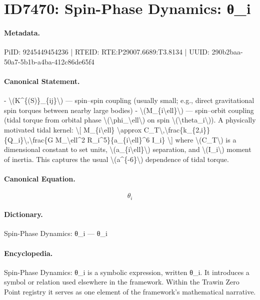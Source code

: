 \section*{ID7470: Spin-Phase Dynamics: θ\_i}
\paragraph{Metadata.}
PiID: 9245449454236 | RTEID: RTE:P29007.6689:T3.8134 | UUID: 290b2baa-50a7-5b1b-a4ba-412c86de65f4

\paragraph{Canonical Statement.}
- \textbackslash{}(K\textasciicircum{}\{(S)\}\_\{ij\}\textbackslash{}) — spin–spin coupling (usually small; e.g., direct gravitational spin torques between nearby large bodies) - \textbackslash{}(M\_\{i\textbackslash{}ell\}\textbackslash{}) — spin–orbit coupling (tidal torque from orbital phase \textbackslash{}(\textbackslash{}phi\_\textbackslash{}ell\textbackslash{}) on spin \textbackslash{}(\textbackslash{}theta\_i\textbackslash{})). A physically motivated tidal kernel: \textbackslash{}[ M\_\{i\textbackslash{}ell\} \textbackslash{}approx C\_T\textbackslash{},\textbackslash{}frac\{k\_\{2,i\}\}\{Q\_i\}\textbackslash{},\textbackslash{}frac\{G M\_\textbackslash{}ell\textasciicircum{}2 R\_i\textasciicircum{}5\}\{a\_\{i\textbackslash{}ell\}\textasciicircum{}6 I\_i\} \textbackslash{}] where \textbackslash{}(C\_T\textbackslash{}) is a dimensional constant to set units, \textbackslash{}(a\_\{i\textbackslash{}ell\}\textbackslash{}) separation, and \textbackslash{}(I\_i\textbackslash{}) moment of inertia. This captures the usual \textbackslash{}(a\textasciicircum{}\{-6\}\textbackslash{}) dependence of tidal torque.

\paragraph{Canonical Equation.}
\[
\theta_i
\]

\paragraph{Dictionary.}
Spin-Phase Dynamics: θ\_i — θ\_i

\paragraph{Encyclopedia.}
Spin-Phase Dynamics: θ\_i is a symbolic expression, written θ\_i. It introduces a symbol or relation used elsewhere in the framework. Within the Trawin Zero Point registry it serves as one element of the framework's mathematical narrative.
